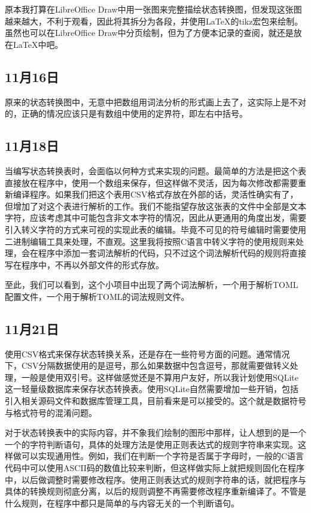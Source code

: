 原本我打算在LibreOffice Draw中用一张图来完整描绘状态转换图，但发现这张图越来越大，不利于观看，因此将其拆分为各段，并使用LaTeX的tikz宏包来绘制。虽然也可以在LibreOffice Draw中分页绘制，但为了方便本记录的查阅，就还是放在LaTeX中吧。


\subsection{11月16日}
原来的状态转换图中，无意中把数组用词法分析的形式画上去了，这实际上是不对的，正确的情况应该只是有数组中使用的定界符，即左右中括号。


\subsection{11月18日}
当编写状态转换表时，会面临以何种方式来实现的问题。最简单的方法是把这个表直接放在程序中，使用一个数组来保存，但这样做不灵活，因为每次修改都需要重新编译程序。如果我们把这个表用CSV格式存放在外部的话，灵活性确实有了，但增加了对这个表进行解析的工作。我们不能指望存放这张表的文件中全部是文本字符，应该考虑其中可能包含非文本字符的情况，因此从更通用的角度出发，需要引入转义字符的方式来可视的实现此表的编辑。毕竟不可见的符号编辑时需要使用二进制编辑工具来处理，不直观。这里我将按照C语言中转义字符的使用规则来处理，会在程序中添加一套词法解析的代码，只不过这个词法解析代码的规则将直接写在程序中，不再以外部文件的形式存放。

至此，我们可以看到，这个小项目中出现了两个词法解析，一个用于解析TOML配置文件，一个用于解析TOML的词法规则文件。


\subsection{11月21日}
使用CSV格式来保存状态转换关系，还是存在一些符号方面的问题。通常情况下，CSV分隔数据使用的是逗号，那么如果数据中包含逗号，那就需要做转义处理，一般是使用双引号。这样做感觉还是不算用户友好，所以我计划使用SQLite这一轻量级数据库来保存状态转换表。使用SQLite自然需要增加一些开销，包括引入相关源码文件和数据库管理工具，目前看来是可以接受的。这个就是数据符号与格式符号的混淆问题。

对于状态转换表中的实际内容，并不象我们绘制的图形中那样，让人想到的是一个一个的字符判断语句，具体的处理方法是使用正则表达式的规则字符串来实现。这样做可以实现通用性。例如，我们在判断一个字符是否属于字母时，一般的C语言代码中可以使用ASCII码的数值比较来判断，但这样做实际上就把规则固化在程序中，以后做调整时需要修改程序。使用正则表达式的规则字符串的话，就把程序与具体的转换规则彻底分离，以后的规则调整不再需要修改程序重新编译了。不管是什么规则，在程序中都只是简单的与内容无关的一个判断语句。



